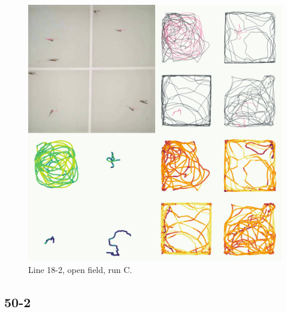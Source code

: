 \documentclass[
]{book}
\begin{document}
\begin{figure}
\includegraphics[width=1\linewidth]{figs/mikk_behaviour/four_panel_plots/open_field_20191119_1459_18-2_R_C_300} \caption{Line 18-2, open field, run C.}\label{fig:4p-18-2-of-C}
\end{figure}

\hypertarget{section-2}{%
\subsection{50-2}\label{section-2}}
\end{document}
